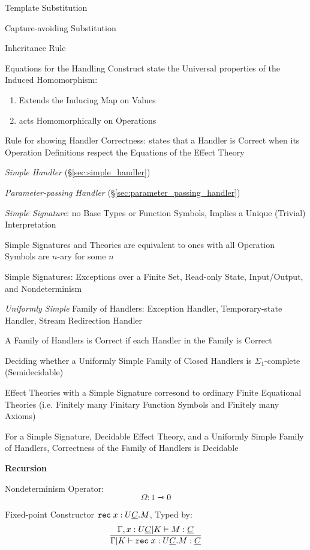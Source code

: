 Template Substitution

Capture-avoiding Substitution

Inheritance Rule

Equations for the Handling Construct state the Universal properties of
the Induced Homomorphism:
\begin{enumerate}
  \item Extends the Inducing Map on Values
  \item acts Homomorphically on Operations
\end{enumerate}

Rule for showing Handler Correctness: %
states that a Handler is Correct when its Operation Definitions
respect the Equations of the Effect Theory

\emph{Simple Handler} (\S\ref{sec:simple_handler})

\emph{Parameter-passing Handler}
(\S\ref{sec:parameter_passing_handler})

\emph{Simple Signature}: no Base Types or Function Symbols, Implies a
Unique (Trivial) Interpretation

Simple Signatures and Theories are equivalent to ones with all
Operation Symbols are $n$-ary for some $n$

Simple Signatures: Exceptions over a Finite Set, Read-only State,
Input/Output, and Nondeterminism

\emph{Uniformly Simple} Family of Handlers: Exception Handler,
Temporary-state Handler, Stream Redirection Handler

A Family of Handlers is Correct if each Handler in the Family is
Correct

Deciding whether a Uniformly Simple Family of Closed Handlers is
$\Sigma_1$-complete (Semidecidable) %

Effect Theories with a Simple Signature corresond to ordinary Finite
Equational Theories (i.e. Finitely many Finitary Function Symbols and
Finitely many Axioms)

For a Simple Signature, Decidable Effect Theory, and a Uniformly
Simple Family of Handlers, Correctness of the Family of Handlers is
Decidable


\textbf{Recursion}

Nondeterminism Operator:
\[
  \Omega : 1 \rightarrowtriangle 0
\]

Fixed-point Constructor $\mathtt{rec}\; x : U \underline{C}.M$, Typed
by:
\[
  \frac{\Gamma,x:U \underline{C} | K \vdash M : \underline{C}}
  {\Gamma | K \vdash \mathtt{rec}\; x : U \underline{C}.M : \underline{C}}
\]

